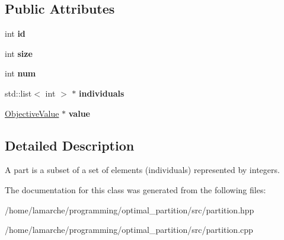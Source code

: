 \subsection*{Public Attributes}
\begin{DoxyCompactItemize}
\item 
\hypertarget{classPart_a838bf6b7710a67f982193a0dcc2f102f}{int {\bfseries id}}\label{classPart_a838bf6b7710a67f982193a0dcc2f102f}

\item 
\hypertarget{classPart_a1048e12cbb00ea6f98edebcab1d05d92}{int {\bfseries size}}\label{classPart_a1048e12cbb00ea6f98edebcab1d05d92}

\item 
\hypertarget{classPart_ac964043da9eea5854384a45ee809a29d}{int {\bfseries num}}\label{classPart_ac964043da9eea5854384a45ee809a29d}

\item 
\hypertarget{classPart_a12f364b91efb5702af492cbdef1990fe}{std\-::list$<$ int $>$ $\ast$ {\bfseries individuals}}\label{classPart_a12f364b91efb5702af492cbdef1990fe}

\item 
\hypertarget{classPart_af9f5786f51cc11cffcf5c77ea656ae40}{\hyperlink{classObjectiveValue}{Objective\-Value} $\ast$ {\bfseries value}}\label{classPart_af9f5786f51cc11cffcf5c77ea656ae40}

\end{DoxyCompactItemize}


\subsection{Detailed Description}
A part is a subset of a set of elements (individuals) represented by integers. 

The documentation for this class was generated from the following files\-:\begin{DoxyCompactItemize}
\item 
/home/lamarche/programming/optimal\-\_\-partition/src/partition.\-hpp\item 
/home/lamarche/programming/optimal\-\_\-partition/src/partition.\-cpp\end{DoxyCompactItemize}
